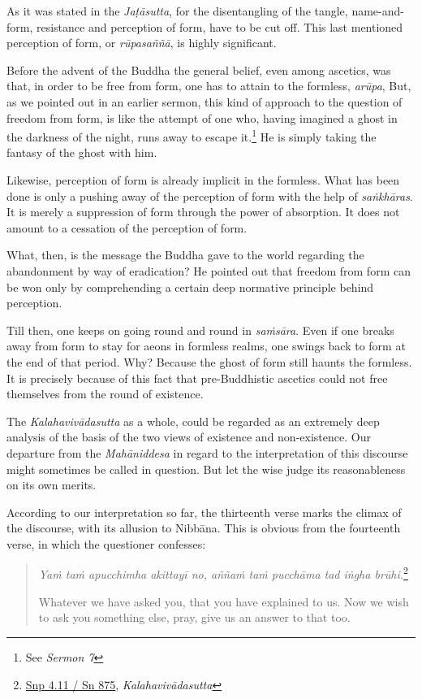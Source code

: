 As it was stated in the \emph{Jaṭāsutta}, for the disentangling of the tangle, name-and-form, resistance and perception of form, have to be cut off. This last mentioned perception of form, or \emph{rūpasaññā}, is highly significant.

Before the advent of the Buddha the general belief, even among ascetics, was that, in order to be free from form, one has to attain to the formless, \emph{arūpa}, But, as we pointed out in an earlier sermon, this kind of approach to the question of freedom from form, is like the attempt of one who, having imagined a ghost in the darkness of the night, runs away to escape it.\footnote{See \emph{Sermon 7}} He is simply taking the fantasy of the ghost with him.

Likewise, perception of form is already implicit in the formless. What has been done is only a pushing away of the perception of form with the help of \emph{saṅkhāras}. It is merely a suppression of form through the power of absorption. It does not amount to a cessation of the perception of form.

What, then, is the message the Buddha gave to the world regarding the abandonment by way of eradication? He pointed out that freedom from form can be won only by comprehending a certain deep normative principle behind perception.

Till then, one keeps on going round and round in \emph{saṁsāra}. Even if one breaks away from form to stay for aeons in formless realms, one swings back to form at the end of that period. Why? Because the ghost of form still haunts the formless. It is precisely because of this fact that pre-Buddhistic ascetics could not free themselves from the round of existence.

The \emph{Kalahavivādasutta} as a whole, could be regarded as an extremely deep analysis of the basis of the two views of existence and non-existence. Our departure from the \emph{Mahāniddesa} in regard to the interpretation of this discourse might sometimes be called in question. But let the wise judge its reasonableness on its own merits.

According to our interpretation so far, the thirteenth verse marks the climax of the discourse, with its allusion to Nibbāna. This is obvious from the fourteenth verse, in which the questioner confesses:

\begin{quote}
\emph{Yaṁ taṁ apucchimha akittayī no, aññaṁ taṁ pucchāma tad iṅgha brūhi.}\footnote{\href{https://suttacentral.net/snp4.11/pli/ms}{Snp 4.11 / Sn 875}, \emph{Kalahavivādasutta}}

Whatever we have asked you, that you have explained to us. Now we wish to ask you something else, pray, give us an answer to that too.
\end{quote}

